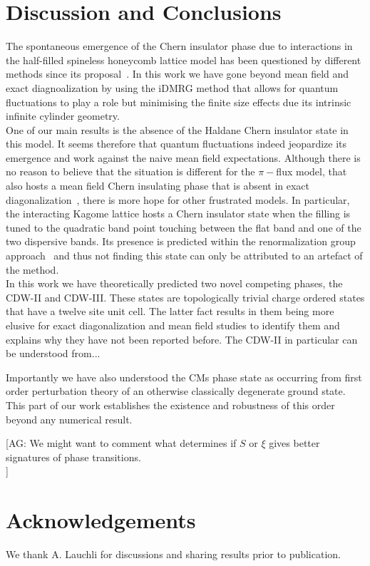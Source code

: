 \documentclass[aps,prx,10pt,twocolumn,floatfix,superscriptaddress,showpacs,numerical,footinbib]{revtex4-1}
\newcommand{\noteAG}[1]{{\color{blue} [AG: #1]}}
\begin{document}
%
\section{\label{sec:discconc}Discussion and Conclusions}
%

The spontaneous emergence of the Chern insulator phase due to interactions in the half-filled spineless honeycomb lattice
model has been questioned by different methods since its proposal~\cite{RQHZ08,WF10,GCC13,GGNVC13,DH14,DCH14}.
%
In this work we have gone beyond mean field and exact diagnoalization by using the iDMRG method that allows for quantum fluctuations
to play a role but minimising the finite size effects due its intrinsic infinite cylinder geometry.\\

One of our main results is the absence of the Haldane Chern insulator state in this model.
%
It seems therefore that quantum fluctuations indeed jeopardize its emergence and work against
the naive mean field expectations.
%
Although there is no reason to believe that the situation is different for the $\pi-$flux model, that also hosts a
mean field Chern insulating phase that is absent in exact diagonalization~\cite{WF10,JGC13}, 
there is more hope for other frustrated models.
%
In particular, the interacting Kagome lattice hosts a Chern insulator state when the filling is tuned to
the quadratic band point touching between the flat band and one of the two dispersive bands.
%
Its presence is predicted within the renormalization group approach~\cite{SF08,SYF09} and thus not finding this state 
can only be attributed to an artefact of the method.\\

In this work we have theoretically predicted two novel competing phases, the CDW-II and CDW-III.
%
These states are topologically trivial charge ordered states that have a twelve site unit cell.
%
The latter fact results in them being more elusive for exact diagonalization and mean field studies to identify them
and explains why they have not been reported before.
%
The CDW-II in particular can be understood from...

Importantly we have also understood the CMs phase state as occurring from first
order perturbation theory of an otherwise classically degenerate ground state.
%
This part of our work establishes the existence and robustness 
of this order beyond any numerical result.
%





\noteAG{We might want to comment what determines if $S$ or $\xi$ gives better signatures of phase transitions. \\}
%
%

\section{Acknowledgements}

We thank A. Lauchli for discussions and sharing results prior to publication.


\end{document}

